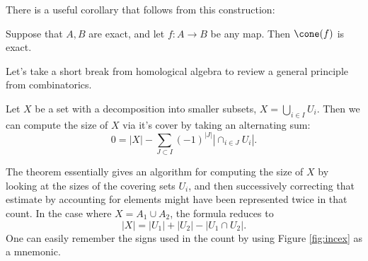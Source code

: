 There is a useful corollary that follows from this construction:
\begin{corollary}
Suppose that $A, B$ are exact, and let $f: A\to B$ be any map. Then $\cone(f)$ is exact. 
\end{corollary}
\begin{elevator}
\end{elevator}
Let's take a short break from homological algebra to review a general principle from combinatorics. 
\begin{theorem}
Let $X$ be a set with a decomposition into smaller subsets, $X=\bigcup_{i\in I} U_i$. Then we can compute the size of $X$ via it's cover by taking an alternating sum:
\[
0=|X|-\sum_{J\subset I}(-1)^{|J|} \left|\cap_{i\in J} U_i\right|. 
\]
\end{theorem}
The theorem essentially gives an algorithm for computing the size of $X$ by looking at the sizes of the covering sets $U_i$, and then successively correcting that estimate by accounting for elements might have been represented twice in that count. In the case where $X=A_1\cup A_2$, the formula reduces to 
\[|X|=|U_1|+|U_2|-|U_1\cap U_2|.\]
One can easily remember the signs used in the count by using Figure \ref{fig:incex} as a mnemonic. 
